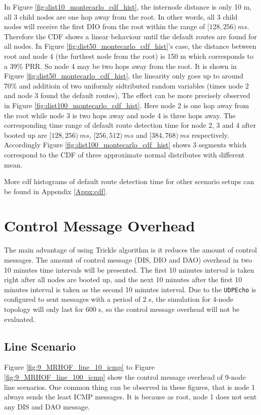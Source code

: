 In Figure \ref{fig:dist10_montecarlo_cdf_hist}, the internode distance is only 10 m, all 3 child nodes are one hop away from the root. In other words, all 3 child nodes will receive the first DIO from the root within the range of $[128, 256)\:ms$. Therefore the CDF shows a linear behaviour until the default routes are found for all nodes. In Figure \ref{fig:dist50_montecarlo_cdf_hist}\@'s case, the distance between root and node 4 (the furthest node from the root) is 150 m which corresponds to a 39\% PRR. So node 4 may be two hops away from the root. It is shown in Figure \ref{fig:dist50_montecarlo_cdf_hist}, the linearity only goes up to around 70\% and additioin of two uniformly sidtributed random variables (times node 2 and node 3 found the default routes),  
\newline
The effect can be more precisely observed in Figure \ref{fig:dist100_montecarlo_cdf_hist}. Here node 2 is one hop away from the root while node 3 is two hops away and node 4 is three hops away. The corresponding time range of default route detection time for node 2, 3 and 4 after booted up are $[128, 256)\:ms$, $[256, 512)\:ms$ and $[384, 768)\:ms$ respectively. Accordingly Figure \ref{fig:dist100_montecarlo_cdf_hist} shows 3 segments which correspond to the CDF of three approximate normal distributes with different mean.
\newline

More cdf histograms of default route detection time for other scenario setups can be found in Appendix \ref{Appx:cdf}. 

\section{Control Message Overhead}
\label{ICMP}
The main advantage of using Trickle algorithm is it reduces the amount of control messages. The amount of control message (DIS, DIO and DAO) overhead in two 10 minutes time intervals will be presented. The first 10 minutes interval is taken right after all nodes are booted up, and the next 10 minutes after the first 10 minutes interval is taken as the second 10 minutes interval. Due to the \texttt{UDPEcho} is configured to sent messages with a period of 2 s, the simulation for 4-node topology will only last for 600 s, so the control message overhead will not be evaluated. 

\subsection{Line Scenario}
\label{icmp:line}
Figure \ref{fig:9_MRHOF_line_10_icmp} to Figure \ref{fig:9_MRHOF_line_100_icmp} show the control message overhead  of 9-node line scenarios. One common thing can be observed in these figures, that is node 1 always sends the least ICMP messages. It is because as root, node 1 does not sent any DIS and DAO message.
\newline


